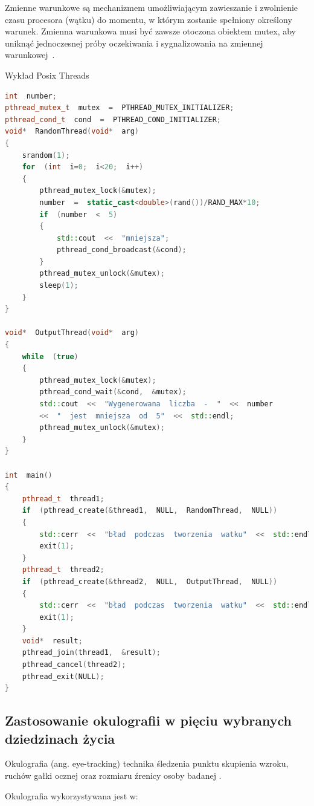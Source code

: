\documentclass[wi]{zut}
\begin{document}
Zmienne warunkowe są mechanizmem umożliwiającym zawieszanie i zwolnienie czasu procesora (wątku) do momentu, w którym zostanie spełniony określony warunek. Zmienna warunkowa musi być zawsze otoczona obiektem mutex, aby uniknąć jednoczesnej próby oczekiwania i sygnalizowania na zmiennej warunkowej~\cite{Palkowski_POSIX}.

{Wykład Posix Threads \cite{Palkowski_POSIX}}{\label{kod:przyklad}}
\begin{lstlisting}[language=C++]
int  number;
pthread_mutex_t  mutex  =  PTHREAD_MUTEX_INITIALIZER;
pthread_cond_t  cond  =  PTHREAD_COND_INITIALIZER;
void*  RandomThread(void*  arg)
{
	srandom(1);
	for  (int  i=0;  i<20;  i++)
	{
		pthread_mutex_lock(&mutex);
		number  =  static_cast<double>(rand())/RAND_MAX*10;
		if  (number  <  5)
		{
			std::cout  <<  "mniejsza";
			pthread_cond_broadcast(&cond);
		}
		pthread_mutex_unlock(&mutex);
		sleep(1);
	}
}

void*  OutputThread(void*  arg)
{
	while  (true)
	{	
		pthread_mutex_lock(&mutex);
		pthread_cond_wait(&cond,  &mutex);
		std::cout  <<  "Wygenerowana  liczba  -  "  <<  number
		<<  "  jest  mniejsza  od  5"  <<  std::endl;
		pthread_mutex_unlock(&mutex);
	}
}

int  main()
{
	pthread_t  thread1;
	if  (pthread_create(&thread1,  NULL,  RandomThread,  NULL))
	{
		std::cerr  <<  "bład  podczas  tworzenia  watku"  <<  std::endl;
		exit(1);
	}
	pthread_t  thread2;
	if  (pthread_create(&thread2,  NULL,  OutputThread,  NULL))
	{
		std::cerr  <<  "bład  podczas  tworzenia  watku"  <<  std::endl;
		exit(1);
	}
	void*  result;
	pthread_join(thread1,  &result);
	pthread_cancel(thread2);
	pthread_exit(NULL);
}
\end{lstlisting}

\subsection{Zastosowanie okulografii w pięciu wybranych dziedzinach życia}

Okulografia (ang. eye-tracking) technika śledzenia punktu skupienia wzroku, ruchów gałki ocznej oraz rozmiaru źrenicy osoby badanej \cite{wiki:Okulografia}.

Okulografia wykorzystywana jest w:
\end{document}
